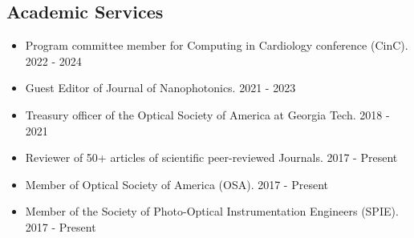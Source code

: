 \documentclass[margin, line]{res}
\begin{document}
\begin{resume}



\section{\sc \textbf{\large{Academic Services}}}
\begin{itemize}
\item Program committee member for Computing in Cardiology conference (CinC). \hspace*{\fill}2022 - 2024
\item Guest Editor of Journal of Nanophotonics. \hspace*{\fill}2021 - 2023
 \item Treasury officer of the Optical Society of America  at Georgia Tech. \hspace*{\fill} 2018 - 2021
\item Reviewer of 50+ articles of scientific peer-reviewed Journals.\hspace*{\fill} 2017 - Present
\item Member of Optical Society of America (OSA).\hspace*{\fill} 2017 - Present
\item Member of the Society of Photo-Optical Instrumentation Engineers (SPIE).\hspace*{\fill} 2017 - Present
\end{itemize}





\end{resume}
\end{document}
